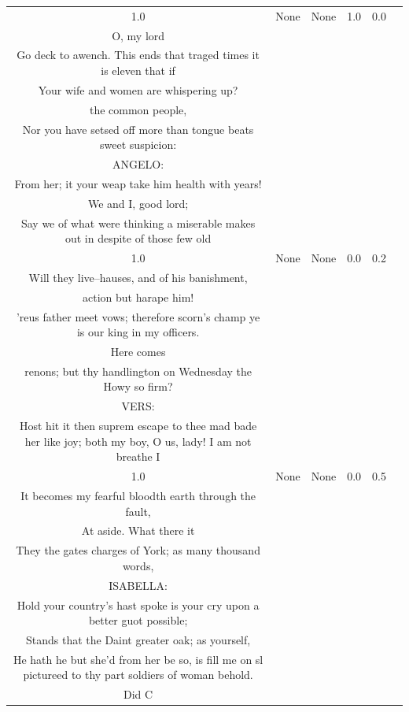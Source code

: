 \documentclass[11pt]{book}
\begin{document}
\begin{longtable}{ccccc >{\raggedright\arraybackslash}p{8cm}}
    1.0 & None & None & 1.0 & 0.0 &
    \begin{tcolorbox}[breakable, enhanced jigsaw, frame hidden, colback=white, boxrule=0pt]
    KING RICHARD:\\
    O, my lord\\
    Go deck to awench. This ends that traged times it is eleven that if\\
    Your wife and women are whispering up?\\
    the common people,\\
    Nor you have setsed off more than tongue beats sweet suspicion:\\
    ANGELO:\\
    From her; it your weap take him health with years!\\
    We and I, good lord;\\
    Say we of what were thinking a miserable makes out in despite of those few old
    \end{tcolorbox} \\
    
    1.0 & None & None & 0.0 & 0.2 &
    \begin{tcolorbox}[breakable, enhanced jigsaw, frame hidden, colback=white, boxrule=0pt]
    KING RICHARD:\\
    Will they live--hauses, and of his banishment,\\
    action but harape him!\\
    'reus father meet vows; therefore scorn's champ ye is our king in my officers.\\
    Here comes\\
    renons; but thy handlington on Wednesday the Howy so firm?\\
    VERS:\\
    Host hit it then suprem escape to thee mad bade her like joy; both my boy, O us, lady! I am not breathe I
    \end{tcolorbox} \\
    
    1.0 & None & None & 0.0 & 0.5 &
    \begin{tcolorbox}[breakable, enhanced jigsaw, frame hidden, colback=white, boxrule=0pt]
    KING RICHARD:\\
    It becomes my fearful bloodth earth through the fault,\\
    At aside. What there it\\
    They the gates charges of York; as many thousand words,\\
    ISABELLA:\\
    Hold your country's hast spoke is your cry upon a better guot possible;\\
    Stands that the Daint greater oak; as yourself,\\
    He hath he but she'd from her be so, is fill me on sl pictureed to thy part soldiers of woman behold.\\
    Did C
    \end{tcolorbox} \\
    

\end{longtable}
\end{document}
